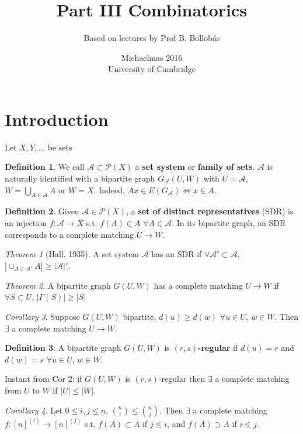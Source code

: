 \documentclass[a4paper]{article}
\title{Part III Combinatorics}
\author{Based on lectures by Prof B. Bollob\'{a}s}
\date{Michaelmas 2016\\University of Cambridge}
\theoremstyle{definition}
\newtheorem*{definition}{Definition}
\theoremstyle{remark}
\theoremstyle{default}
\newtheorem{theorem}{Theorem}
\newtheorem{corollary}[theorem]{Corollary}
\newcommand*\abs[1]{\left|#1\right|}
\begin{document}
\maketitle
\tableofcontents
\newpage
\section{Introduction}
Let $X, Y, \dots$ be sets
\begin{definition}
	We call $\mathcal{A}\subset \mathcal{P}(X)$ a \textbf{set system} or \textbf{family of sets}.
	$\mathcal{A}$ is naturally identified with a bipartite graph $G_\mathcal{A}(U,W)$ with $U=\mathcal{A}$, $W=\bigcup_{A\in\mathcal{A}}A$ or $W=X$.
	Indeed, $Ax\in E(G_\mathcal{A}) \iff x \in A$.
\end{definition}

\begin{definition}
	Given $\mathcal{A}\in\mathcal{P}(X)$, a \textbf{set of distinct representatives} (SDR) is an injection $f:\mathcal{A}\to X$ s.t. $f(A)\in A$ $\forall A \in \mathcal{A}$.
	In its bipartite graph, an SDR corresponds to a complete matching $U \to W$.
\end{definition}

\begin{theorem}[Hall, 1935]
	A set system $\mathcal{A}$ has an SDR if $\forall \mathcal{A}'\subset\mathcal{A}$, $\abs{\cup_{A\in\mathcal{A}'}A} \geq \abs{\mathcal{A}}'$.
\end{theorem}
\setcounter{theorem}{0}
\renewcommand{\thetheorem}{\arabic{theorem}'}
\begin{theorem}
	A bipartite graph $G(U,W)$ has a complete matching $U \to W$ if $\forall S \subset U$, $\abs{\Gamma(S)} \geq \abs{S}$
\end{theorem}
\renewcommand{\thetheorem}{\arabic{theorem}}
\begin{corollary}
	Suppose $G(U, W)$ bipartite, $d(u) \geq d(w)$ $\forall u \in U,\ w \in W$. Then $\exists$ a complete matching $U \to W$.
\end{corollary}

\begin{definition}
	A bipartite graph $G(U,W)$ is $(r,s)$\textbf{-regular} if $d(u)=r$ and $d(w)=s$ $\forall u\in U$, $w \in W$.
\end{definition}

Instant from Cor 2: if $G(U,W)$ is $(r,s)$-regular then $\exists$ a complete matching from $U$ to $W$ if $\abs{U} \leq \abs{W}$.

\begin{corollary}
	Let $0 \leq i,j \leq n$, ${n \choose i} \leq {n \choose j}$. Then $\exists$ a complete matching $f: [n]^{(i)} \to [n]^{(j)}$ s.t. $f(A) \subset A$ if $j \leq i$, and $f(A) \supset A$ if $i \leq j$.
\end{corollary}
\end{document}
